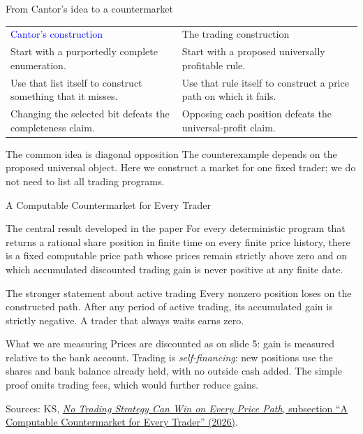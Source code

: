 \documentclass{beamer}
\newcommand{\doiref}[2]{%
  \href{https://doi.org/#1}{\textcolor{blue!65!black}{#2}}}
\newcommand{\sourcefoot}[1]{%
  \par\vfill{\fontsize{6.3}{7.5}\selectfont\color{black!65}Sources: #1\par}}
\begin{document}
\begin{frame}{From Cantor's idea to a countermarket}
\small

\begin{tabular}{@{}
  >{\raggedright\arraybackslash}p{}
  @{\hspace{0.03\textwidth}}
  >{\raggedright\arraybackslash}p{}
  @{}}
\textcolor{blue}{Cantor's construction}
&
\textcolor{green!50!black}{The trading construction}
\\[0.8em]

\rowcolor{black!15}
Start with a purportedly complete enumeration.
&
Start with a proposed universally profitable rule.
\\[1em]


Use that list itself to construct something that it misses.
&
Use that rule itself to construct a price path on which it fails.
\\[1em]

\rowcolor{black!15}
Changing the selected bit defeats the completeness claim.
&
Opposing each position defeats the universal-profit claim.
\end{tabular}

\medskip
\begin{alertblock}{The common idea is diagonal opposition}
The counterexample depends on the proposed universal object.
Here we construct a market for one fixed trader; we do not need to list
all trading programs.
\end{alertblock}
\end{frame}

\begin{frame}{A Computable Countermarket for Every Trader}
\small
\begin{block}{The central result developed in the paper}
For every deterministic program that returns a rational share position in
finite time on every finite price history, there is a fixed computable price
path whose prices remain strictly above zero and on which accumulated
discounted trading gain is never positive at any finite date.
\end{block}
\begin{exampleblock}{The stronger statement about active trading}
Every nonzero position loses on the constructed path.
After any period of active trading, its accumulated gain is strictly
negative. A trader that always waits earns zero.
\end{exampleblock}
\begin{alertblock}{What we are measuring}
Prices are discounted as on slide 5: gain is measured relative to the bank
account. Trading is \emph{self-financing}: new positions use the shares and
bank balance already held, with no outside cash added. The simple proof
omits trading fees, which would further reduce gains.
\end{alertblock}
\sourcefoot{KS, \doiref{10.48550/arXiv.2604.13334}{\emph{No Trading Strategy Can Win on Every Price Path},
subsection \enquote{A Computable Countermarket for Every Trader} (2026)}.}
\end{frame}
\end{document}
